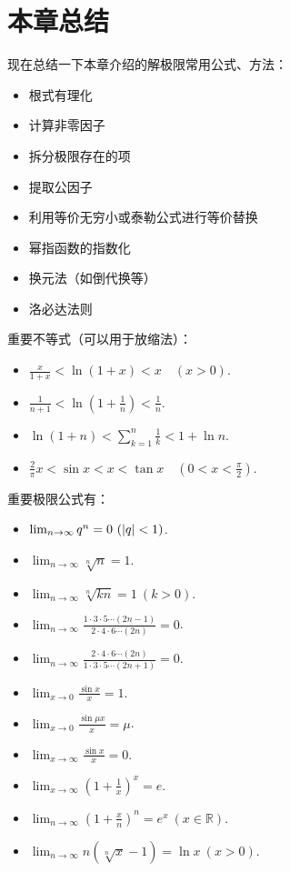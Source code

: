 \section{本章总结}
现在总结一下本章介绍的解极限常用公式、方法：
\begin{itemize}
	\item 根式有理化
	\item 计算非零因子
	\item 拆分极限存在的项
	\item 提取公因子
	\item 利用等价无穷小或泰勒公式进行等价替换
	\item 幂指函数的指数化
	\item 换元法（如倒代换等）
	\item 洛必达法则
\end{itemize}

重要不等式（可以用于放缩法）：
\begin{itemize}
	\item \(\frac{x}{1+x} < \ln(1+x) < x \quad(x>0)\).%
	\item \(\frac1{n+1} < \ln(1+\frac1n) < \frac1n\).
	\item \(\ln(1+n) < \sum_{k=1}^n \frac1{k} < 1 + \ln n\).
	\item \(\frac2\pi x < \sin x < x < \tan x \quad(0<x<\frac\pi2)\).
\end{itemize}

重要极限公式有：
\begin{itemize}
	\item \(\lim_{n\to\infty} q^n=0\ (\abs{q}<1)\).%
	\item \(\lim_{n\to\infty} \sqrt[n]{n}=1\).%
	\item \(\lim_{n\to\infty} \sqrt[n]{k n} = 1\ (k>0)\).%
	\item \(\lim_{n\to\infty} \frac{1 \cdot 3 \cdot 5 \dotsm (2n-1)}{2 \cdot 4 \cdot 6 \dotsm (2n)} = 0\).%
	\item \(\lim_{n\to\infty} \frac{2 \cdot 4 \cdot 6 \dotsm (2n)}{1 \cdot 3 \cdot 5 \dotsm (2n+1)} = 0\).%
	\item \(\lim_{x\to0} \frac{\sin x}{x} = 1\).%
	\item \(\lim_{x\to0} \frac{\sin \mu x}{x}=\mu\).
	\item \(\lim_{x\to\infty} \frac{\sin x}{x} = 0\).
	\item \(\lim_{x\to\infty} \left(1+\frac1x\right)^x = e\).%
	\item \(\lim_{n\to\infty} \left(1+\frac{x}{n}\right)^n=e^x\ (x\in\mathbb{R})\).%
	\item \(\lim_{n\to\infty} n\left(\sqrt[n]{x}-1\right)=\ln x\ (x>0)\).%
\end{itemize}

